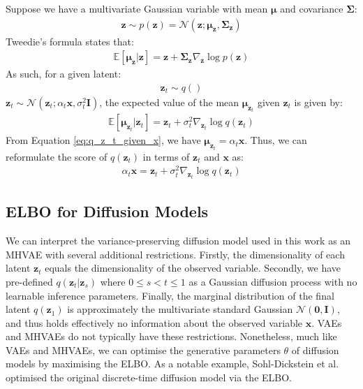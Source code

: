 \documentclass[ oneside,%
                    author={George Herbert},
                    degree={MSci},
                     title={Video Diffusion Models for Climate Simulations},
                  subtitle={}]{dissertation}
\begin{document}
Suppose we have a multivariate Gaussian variable with mean $\boldsymbol\mu$ and covariance $\boldsymbol\Sigma$:
\begin{align}
      \mathbf{z}\sim p(\mathbf{z})=\mathcal{N}(\mathbf{z}; \boldsymbol\mu_{\mathbf{z}}, \boldsymbol\Sigma_{\mathbf{z}})
\end{align}
Tweedie's formula states that:
\begin{align}
\mathbb{E}\left[\boldsymbol\mu_{\mathbf{z}}|\mathbf{z}\right]=\mathbf{z}+\boldsymbol\Sigma_{\mathbf{z}} \nabla_{\mathbf{z}}\log p(\mathbf{z})
\end{align}
As such, for a given latent:
\begin{align}
      \mathbf{z}_t\sim q()
\end{align}
$\mathbf{z}_t\sim\mathcal{N}(\mathbf{z}_t; \alpha_t\mathbf{x}, \sigma_t^2\mathbf{I})$, the expected value of the mean $\boldsymbol{\mu}_{\mathbf{z}_t}$ given $\mathbf{z}_t$ is given by:
\begin{align}
      \mathbb{E}\left[\boldsymbol\mu_{\mathbf{z}_t}|\mathbf{z}_t\right]=\mathbf{z}_t+\sigma_t^2\nabla_{\mathbf{z}_t}\log q(\mathbf{z}_t)
\end{align}
From Equation \ref{eq:q_z_t_given_x}, we have $\boldsymbol\mu_{\mathbf{z}_t}=\alpha_t\mathbf{x}$. Thus, we can reformulate the score of $q(\mathbf{z}_t)$ in terms of $\mathbf{z}_t$ and $\mathbf{x}$ as:
\begin{align}
      \alpha_t\mathbf{x}=\mathbf{z}_t + \sigma_t^2\nabla_{\mathbf{z}_t}\log q(\mathbf{z}_t)
\end{align}


\subsection{ELBO for Diffusion Models}
\label{sec:background_diffusion_elbo}

We can interpret the variance-preserving diffusion model used in this work as an MHVAE with several additional restrictions. Firstly, the dimensionality of each latent $\mathbf{z}_t$ equals the dimensionality of the observed variable. Secondly, we have pre-defined $q(\mathbf{z}_t|\mathbf{z}_s)$ where $0\le s<t\le 1$ as a Gaussian diffusion process with no learnable inference parameters. Finally, the marginal distribution of the final latent $q(\mathbf{z}_1)$ is approximately the multivariate standard Gaussian $\mathcal{N}(\mathbf{0}, \mathbf{I})$, and thus holds effectively no information about the observed variable $\mathbf{x}$. VAEs and MHVAEs do not typically have these restrictions. Nonetheless, much like VAEs and MHVAEs, we can optimise the generative parameters $\theta$ of diffusion models by maximising the ELBO. As a notable example, Sohl-Dickstein et al. \cite{Deep_Unsupervised_Learning_Sohl-Dickstein} optimised the original discrete-time diffusion model via the ELBO. 
\end{document}
